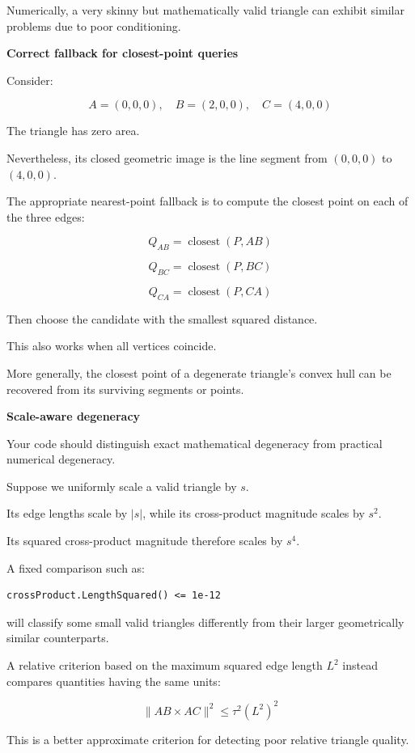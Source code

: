 Numerically, a very skinny but mathematically valid triangle can exhibit similar problems due to poor conditioning.

\textbf{Correct fallback for closest-point queries}

Consider:

\[
A=(0,0,0),\quad B=(2,0,0),\quad C=(4,0,0)
\]

The triangle has zero area.

Nevertheless, its closed geometric image is the line segment from \((0,0,0)\) to \((4,0,0)\).

The appropriate nearest-point fallback is to compute the closest point on each of the three edges:

\[
Q_{AB}=\operatorname{closest}(P,AB)
\]

\[
Q_{BC}=\operatorname{closest}(P,BC)
\]

\[
Q_{CA}=\operatorname{closest}(P,CA)
\]

Then choose the candidate with the smallest squared distance.

This also works when all vertices coincide.

More generally, the closest point of a degenerate triangle's convex hull can be recovered from its surviving segments or points.

\textbf{Scale-aware degeneracy}

Your code should distinguish exact mathematical degeneracy from practical numerical degeneracy.

Suppose we uniformly scale a valid triangle by \(s\).

Its edge lengths scale by \(|s|\), while its cross-product magnitude scales by \(s^2\).

Its squared cross-product magnitude therefore scales by \(s^4\).

A fixed comparison such as:

\begin{verbatim}
crossProduct.LengthSquared() <= 1e-12
\end{verbatim}

will classify some small valid triangles differently from their larger geometrically similar counterparts.

A relative criterion based on the maximum squared edge length \(L^2\) instead compares quantities having the same units:

\[
\boxed{ \|AB\times AC\|^2\le\tau^2(L^2)^2 }
\]

This is a better approximate criterion for detecting poor relative triangle quality.

